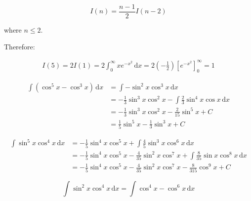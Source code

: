 \documentclass[12pt]{article}
\begin{document}
\begin{equation}
    I(n) = \frac{n - 1}{2} I(n - 2)
\end{equation}

where $n \le 2$.

Therefore:

\begin{equation}
    \begin{split}
        I(5) = 2I(1) = 2\int_{0}^{\infty} x e^{-x^{2}} \, \mathrm{d}x = 2 \left( -\frac{1}{2} \right) \left[ e^{-x^{2}} \right]_{0}^{\infty} = 1
    \end{split}
\end{equation}



\begin{equation}
    \begin{split}
        \int \left( \cos^{5}{x} - \cos^{3}{x} \right) \, \mathrm{d}x &= \int -\sin^{2}{x} \cos^{3}{x} \, \mathrm{d}x \\
        &= -\frac{1}{3} \sin^{3}{x} \cos^{2}{x} - \int \frac{2}{3} \sin^{4}{x} \cos{x} \, \mathrm{d}x \\
        &= -\frac{1}{3} \sin^{3}{x} \cos^{2}{x} - \frac{2}{15} \sin^{5}{x} + C \\
        &= \frac{1}{5} \sin^{5}{x} - \frac{1}{3} \sin^{3}{x} + C
    \end{split}
\end{equation}


\begin{equation}
    \begin{split}
        \int \sin^{5}{x} \cos^{4}{x} \, \mathrm{d}x &= -\frac{1}{5} \sin^{4}{x} \cos^{5}{x} + \int \frac{4}{5} \sin^{3}{x} \cos^{6}{x} \, \mathrm{d}x \\
        &= -\frac{1}{5} \sin^{4}{x} \cos^{5}{x} - \frac{4}{35} \sin^{2}{x} \cos^{7}{x} + \int \frac{8}{35} \sin{x} \cos^{8}{x} \, \mathrm{d}x \\
        &= -\frac{1}{5} \sin^{4}{x} \cos^{5}{x} - \frac{4}{35} \sin^{2}{x} \cos^{7}{x} - \frac{8}{315} \cos^{9}{x} + C
    \end{split}
\end{equation}


\begin{equation}
    \int \sin^{2}{x} \cos^{4}{x} \, \mathrm{d}x = \int \cos^{4}{x} - \cos^{6}{x} \, \mathrm{d}x
\end{equation}
\end{document}
